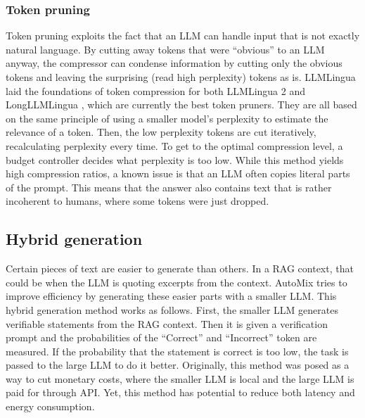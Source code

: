 \subsubsection{Token pruning}
Token pruning exploits the fact that an LLM can handle input that is not exactly natural language. By cutting away tokens that were ``obvious'' to an LLM anyway, the compressor can condense information by cutting only the obvious tokens and leaving the surprising (read high perplexity) tokens as is. LLMLingua \cite{jiang2023llmlingua} laid the foundations of token compression for both LLMLingua 2 \cite{pan2024llmlingua2} and LongLLMLingua \cite{jiang2023longllmlingua}, which are currently the best token pruners. They are all based on the same principle of using a smaller model's perplexity to estimate the relevance of a token. Then, the low perplexity tokens are cut iteratively, recalculating perplexity every time. To get to the optimal compression level, a budget controller decides what perplexity is too low. While this method yields high compression ratios, a known issue is that an LLM often copies literal parts of the prompt. This means that the answer also contains text that is rather incoherent to humans, where some tokens were just dropped.

\subsection{Hybrid generation}
Certain pieces of text are easier to generate than others. In a RAG context, that could be when the LLM is quoting excerpts from the context. AutoMix \cite{aggarwal2024automix} tries to improve efficiency by generating these easier parts with a smaller LLM. This hybrid generation method works as follows. First, the smaller LLM generates verifiable statements from the RAG context. Then it is given a verification prompt and the probabilities of the ``Correct'' and ``Incorrect'' token are measured. If the probability that the statement is correct is too low, the task is passed to the large LLM to do it better. Originally, this method was posed as a way to cut monetary costs, where the smaller LLM is local and the large LLM is paid for through API. Yet, this method has potential to reduce both latency and energy consumption.

